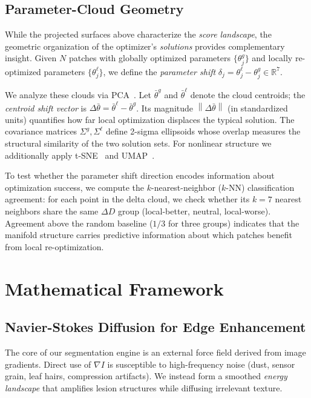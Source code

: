 \documentclass[11pt,a4paper]{article}
\newcommand{\R}{\mathbb{R}}
\newcommand{\grad}{\nabla}
\newcommand{\norm}[1]{\left\lVert #1 \right\rVert}
\begin{document}
\subsection{Parameter-Cloud Geometry}
\label{sec:param_geometry_math}
While the projected surfaces above characterize the \emph{score landscape}, the geometric organization of the optimizer's \emph{solutions} provides complementary insight. Given $N$ patches with globally optimized parameters $\{\theta_j^g\}$ and locally re-optimized parameters $\{\theta_j^\ell\}$, we define the \emph{parameter shift} $\delta_j = \theta_j^\ell - \theta_j^g \in \R^7$.

We analyze these clouds via PCA~\citep{jolliffe2016pca}. Let $\bar\theta^g$ and $\bar\theta^\ell$ denote the cloud centroids; the \emph{centroid shift vector} is $\Delta\bar\theta = \bar\theta^\ell - \bar\theta^g$. Its magnitude $\norm{\Delta\bar\theta}$ (in standardized units) quantifies how far local optimization displaces the typical solution. The covariance matrices $\Sigma^g, \Sigma^\ell$ define 2-sigma ellipsoids whose overlap measures the structural similarity of the two solution sets. For nonlinear structure we additionally apply t-SNE~\citep{vandermaaten2008tsne} and UMAP~\citep{mcinnes2018umap}.

To test whether the parameter shift direction encodes information about optimization success, we compute the $k$-nearest-neighbor ($k$-NN) classification agreement: for each point in the delta cloud, we check whether its $k{=}7$ nearest neighbors share the same $\Delta D$ group (local-better, neutral, local-worse). Agreement above the random baseline ($1/3$ for three groups) indicates that the manifold structure carries predictive information about which patches benefit from local re-optimization.

\section{Mathematical Framework}

\subsection{Navier-Stokes Diffusion for Edge Enhancement}
The core of our segmentation engine is an external force field derived from image gradients. Direct use of $\grad I$ is susceptible to high-frequency noise (dust, sensor grain, leaf hairs, compression artifacts). We instead form a smoothed \emph{energy landscape} that amplifies lesion structures while diffusing irrelevant texture.
\end{document}
